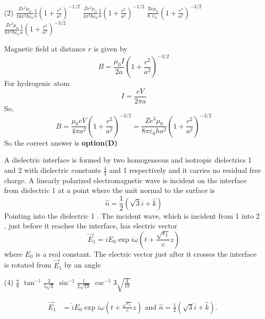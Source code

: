 \begin{questions}
\begin{tasks}(2)
	\task[\textbf{A.}] $\frac{Z e^{2} \mu_{0}}{16 \pi^{2} \hbar \epsilon_{0}} \frac{1}{a}\left(1+\frac{r^{2}}{a^{2}}\right)^{-1 / 2}$
	\task[\textbf{B.}]   $\frac{Z e^{2} \mu_{0}}{4 \pi^{2} \hbar \epsilon_{0}} \frac{1}{a}\left(1+\frac{r^{2}}{a^{2}}\right)^{-1 / 2}$
	\task[\textbf{C.}] $\frac{\mathrm{Ze} \mu_{0}}{\hbar \in_{0}}\left(1+\frac{r^{2}}{a^{2}}\right)^{-3 / 2}$
	\task[\textbf{D.}] $\frac{Z e^{2} \mu_{0}}{8 \pi^{2} \hbar \epsilon_{0}} \frac{1}{a}\left(1+\frac{r^{2}}{a^{2}}\right)^{-3 / 2}$
\end{tasks}
\begin{answer}
	Magnetic field at distance $r$ is given by
	$$
	B=\frac{\mu_{0} I}{2 a}\left(1+\frac{r^{2}}{a^{2}}\right)^{-3 / 2}
	$$
	For hydrogenic atom
	$$
	I=\frac{e V}{2 \pi a}
	$$
	So,
	$$
	B=\frac{\mu_{0} e V}{4 \pi a^{2}}\left(1+\frac{r^{2}}{a^{2}}\right)^{-3 / 2}=\frac{Z e^{3} \mu_{0}}{8 \pi \varepsilon_{0} h a^{2}}\left(1+\frac{r^{2}}{a^{2}}\right)^{-3 / 2}
	$$
	So the correct answer is \textbf{option(D)}
\end{answer}
\begin{minipage}{\textwidth}
	\question A dielectric interface is formed by two homogeneous and isotropic dielectrics 1 and 2 with dielectric constants $\frac{4}{3}$ and 1 respectively and it carries no residual free charge. A linearly polarized electromagnetic wave is incident on the interface from dielectric 1 at a point where the unit normal to the surface is
	$$
	\hat{n}=\frac{1}{2}(\sqrt{3} i+\hat{k})
	$$
	Pointing into the dielectric 1 . The incident wave, which is incident from 1 into 2 , just before it reaches the interface, has electric vector
	$$
	\vec{E}_{1}=i E_{0} \exp i \omega\left(t+\frac{\sqrt{\epsilon_{1}}}{c} z\right)
	$$
	where $E_{0}$ is a real constant. The electric vector just after it crosses the interface is rotated from $\vec{E}_{1}$ by an angle
\end{minipage}
\begin{tasks}(4)
	\task[\textbf{A.}] $\frac{\pi}{6}$
	\task[\textbf{B.}] $\tan ^{-1} \frac{2}{5 \sqrt{3}}$
	\task[\textbf{C.}] $\sin ^{-1} \frac{1}{2 \sqrt{19}}$
	\task[\textbf{D.}] $\csc ^{-1} 3 \sqrt{\frac{4}{19}}$
\end{tasks}
\begin{answer}
	\begin{align*}
	\vec{E}_{1}&=\hat{i} E_{0} \exp i \omega\left(t+\frac{\sqrt{\varepsilon_{1}}}{c} z\right) \text { and } \hat{n}=\frac{1}{2}(\sqrt{3} \hat{i}+\hat{k}) \text {. }

\end{align*}
\end{answer}
\end{questions}
